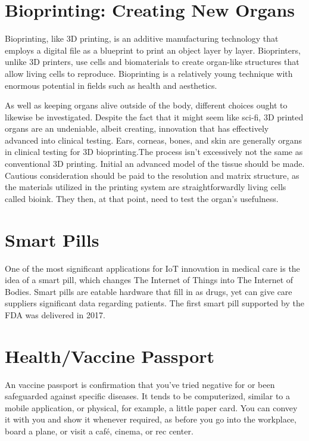 \documentclass[11pt]{article}
\begin{document}
\section{Bioprinting: Creating New Organs}

Bioprinting, like 3D printing, is an additive manufacturing technology that employs a digital file as a blueprint to print an object layer by layer. Bioprinters, unlike 3D printers, use cells and biomaterials to create organ-like structures that allow living cells to reproduce. Bioprinting is a relatively young technique with enormous potential in fields such as health and aesthetics.


As well as keeping organs alive outside of the body, different choices ought to likewise be investigated. Despite the fact that it might seem like sci-fi, 3D printed organs are an undeniable, albeit creating, innovation that has effectively advanced into clinical testing. Ears, corneas, bones, and skin are generally organs in clinical testing for 3D bioprinting.The process isn't excessively not the same as conventional 3D printing. Initial an advanced model of the tissue should be made. Cautious consideration should be paid to the resolution and matrix structure, as the materials utilized in the printing system are straightforwardly living cells called bioink. They then, at that point, need to test the organ's usefulness.


\section{Smart Pills}

One of the most significant applications for IoT innovation in medical care is the idea of a smart pill, which changes The Internet of Things into The Internet of Bodies. Smart pills are eatable hardware that fill in as drugs, yet can give care suppliers significant data regarding patients. The first smart pill supported by the FDA was delivered in 2017.


\section{Health/Vaccine Passport}

An vaccine passport is confirmation that you've tried negative for or been safeguarded against specific diseases. It tends to be computerized, similar to a mobile application, or physical, for example, a little paper card. You can convey it with you and show it whenever required, as before you go into the workplace, board a plane, or visit a café, cinema, or rec center.
\end{document}
